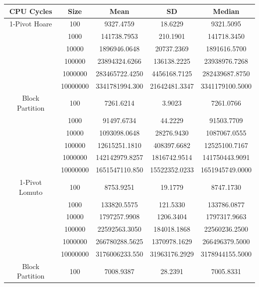 \documentclass{article}
\begin{document}
\begin{center}
    \small
    \begin{tabular}{ |c c | c c c| }
        \hline
        CPU Cycles      & Size     & Mean           & SD            & Median \\
        \hline
        1-Pivot Hoare   & 100      & 9327.4759      & 18.6229       & 9321.5095 \\
                        & 1000     & 141738.7953    & 210.1901      & 141718.3450 \\
                        & 10000    & 1896946.0648   & 20737.2369    & 1891616.5700 \\
                        & 100000   & 23894324.6266  & 136138.2225   & 23938976.7268 \\
                        & 1000000  & 283465722.4250 & 4456168.7125  & 282439687.8750 \\
                        & 10000000 & 3341781994.300 & 21642481.3347 & 3341179100.5000 \\
        Block Partition & 100      & 7261.6214      & 3.9023        & 7261.0766 \\
                        & 1000     & 91497.6734     & 44.2229       & 91503.7709 \\
                        & 10000    & 1093098.0648   & 28276.9430    & 1087067.0555 \\
                        & 100000   & 12615251.1810  & 408397.6682   & 12525100.7167 \\
                        & 1000000  & 142142979.8257 & 1816742.9514  & 141750443.9091 \\
                        & 10000000 & 1651547110.850 & 15522352.0233 & 1651945749.0000 \\
        \hline
        1-Pivot Lomuto  & 100      & 8753.9251      & 19.1779       & 8747.1730 \\
                        & 1000     & 133820.5575    & 121.5330      & 133786.0877 \\
                        & 10000    & 1797257.9908   & 1206.3404     & 1797317.9663 \\
                        & 100000   & 22592563.3050  & 184018.1868   & 22560236.2500 \\
                        & 1000000  & 266780288.5625 & 1370978.1629  & 266496379.5000 \\
                        & 10000000 & 3176006233.550 & 31963176.2929 & 3178944155.5000 \\
        Block Partition & 100      & 7008.9387      & 28.2391       & 7005.8331 \\

\end{tabular}
\end{center}
\end{document}
